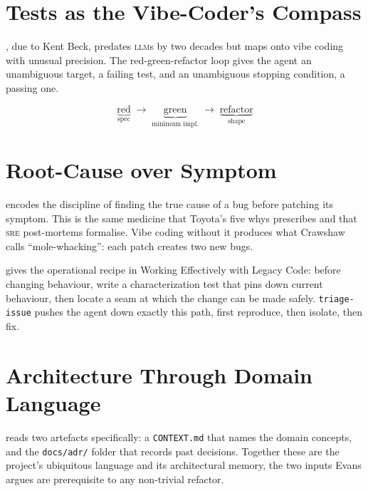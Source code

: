 \documentclass{../sharedAssets/tufte}
\begin{document}
\section{Tests as the Vibe-Coder's Compass}
\label{sec:tdd-theory}

, due to Kent Beck\cite{beck2002tdd},
predates \textsc{llm}s by two decades but maps onto vibe coding with
unusual precision. The red-green-refactor loop gives the agent an
unambiguous target, a failing test, and an unambiguous stopping
condition, a passing one.

\[
\underbrace{\text{red}}_{\text{spec}} \;\longrightarrow\;
\underbrace{\text{green}}_{\text{minimum impl.}} \;\longrightarrow\;
\underbrace{\text{refactor}}_{\text{shape}}
\]


\section{Root-Cause over Symptom}
\label{sec:triage-theory}

 encodes the discipline of finding the
true cause of a bug before patching its symptom. This is the same
medicine that Toyota's five whys prescribes and that
\textsc{sre} post-mortems formalise. Vibe coding without it produces
what Crawshaw calls ``mole-whacking''\cite{crawshaw2024sketch}: each
patch creates two new bugs.

 gives the operational recipe in
Working Effectively with Legacy Code\cite{feathers2004legacy}:
before changing behaviour, write a characterization test that
pins down current behaviour, then locate a seam at which the
change can be made safely. \texttt{triage-issue} pushes the agent down
exactly this path, first reproduce, then isolate, then fix.

\section{Architecture Through Domain Language}
\label{sec:architecture-theory}

 reads two artefacts
specifically: a \texttt{CONTEXT.md} that names the domain concepts, and
the \texttt{docs/adr/} folder that records past decisions. Together
these are the project's ubiquitous language and its
architectural memory, the two inputs Evans argues are
prerequisite to any non-trivial refactor.\cite{evans2003ddd}
\end{document}
